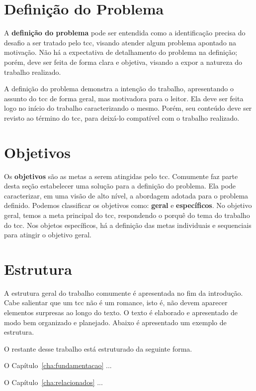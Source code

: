 \documentclass{eic-bcc-tcc}
\begin{document}
\section{Definição do Problema}

A \textbf{definição do problema} pode ser entendida como a identificação precisa do desafio a ser tratado pelo \gls{tcc}, visando atender algum problema apontado na motivação. Não há a expectativa de detalhamento do problema na definição; porém, deve ser feita de forma clara e objetiva, visando a expor a natureza do trabalho realizado.

A definição do problema demonstra a intenção do trabalho, apresentando o assunto do \gls{tcc} de forma geral, mas motivadora para o leitor. Ela deve ser feita logo no início do trabalho caracterizando o mesmo. Porém, seu conteúdo deve ser revisto ao término do \gls{tcc}, para deixá-lo compatível com o trabalho realizado.

\section{Objetivos}

Os \textbf{objetivos} são as metas a serem atingidas pelo \gls{tcc}. Comumente faz parte desta seção estabelecer uma solução para a definição do problema. Ela pode caracterizar, em uma visão de alto nível, a abordagem adotada para o problema definido. Podemos classificar os objetivos como: \textbf{geral} e \textbf{específicos}. No objetivo geral, temos a meta principal do \gls{tcc}, respondendo o porquê do tema do trabalho do \gls{tcc}. Nos objetos específicos, há a definição das metas individuais e sequenciais para atingir o objetivo geral.

\section{Estrutura}

A estrutura geral do trabalho comumente é apresentada no fim da introdução. Cabe salientar que um \gls{tcc} não é um romance, isto é, não devem aparecer elementos surpresas ao longo do texto. O texto é elaborado e apresentado de modo bem organizado e planejado. Abaixo é apresentado um exemplo de estrutura.

O restante desse trabalho está estruturado da seguinte forma.

O Capítulo~\ref{cha:fundamentacao} ...

O Capítulo~\ref{cha:relacionados} ...
\end{document}
